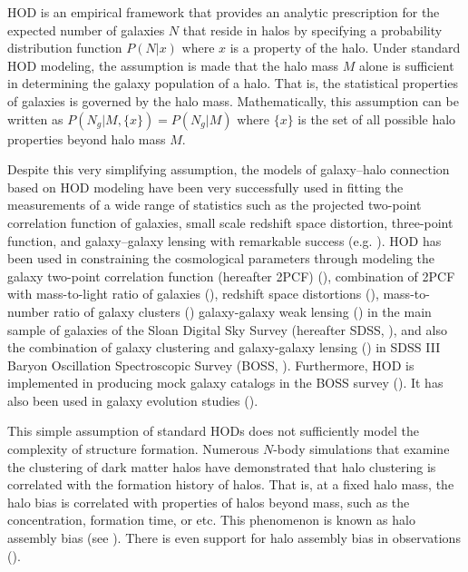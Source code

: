 \documentclass[12pt, preprint]{aastex}
\begin{document}
HOD is an empirical framework that provides an analytic prescription for the expected number of galaxies $N$ that reside in halos by specifying a probability distribution function $P(N|x)$ where $x$ is a property of the halo. Under standard HOD modeling, the assumption is made that the halo mass $M$ alone is sufficient in determining the galaxy population of a halo. That is, the statistical properties of galaxies is governed by the halo mass. Mathematically, this assumption can be written as $P(N_g|M,\{x\})=P(N_g|M)$ where $\{x\}$ is the set of all possible halo properties beyond halo mass $M$.

Despite this very simplifying assumption, the models of galaxy--halo connection based on HOD modeling have been very successfully used in fitting the measurements of a wide range of statistics such as the projected two-point correlation function of galaxies, small scale redshift space distortion, three-point function, and galaxy--galaxy lensing with remarkable success (e.g. \citealt{zheng07,tinker_rsd2007,zehavi2011,leauthaud12,parejko2013,coupon2015,hod-3pcf,guo2015,miyatake15,zu2015,hod_vs_sham}). 
HOD has been used in constraining the cosmological parameters through modeling the galaxy two-point correlation function (hereafter 2PCF) (\citealt{abazajian2005}), combination of 2PCF with mass-to-light ratio of galaxies (\citealt{tinker05}), redshift space distortions (\citealt{tinker_rsd2007}), mass-to-number ratio of galaxy clusters (\citealt{tinker2012}) galaxy-galaxy weak lensing (\citealt{vdb03,cacciato13,more13,vdb13}) in the main sample of galaxies
of the Sloan Digital Sky Survey (hereafter SDSS, \citealt{york2000}), and also the combination of galaxy clustering and galaxy-galaxy lensing (\citealt{more15}) in SDSS III Baryon Oscillation Spectroscopic Survey (BOSS, \citealt{boss}). Furthermore, HOD is implemented in producing mock galaxy catalogs in the BOSS survey (\citealt{manera2013,white2014}). It has also been used in galaxy evolution studies (\citealt{conroy2009,leauthaud12,behroozi13,hudson2015,zu2015,zu2016}).

This simple assumption of standard HODs  
does not sufficiently model the complexity of structure formation. Numerous $N$-body simulations that examine the clustering of 
dark matter halos have demonstrated that halo clustering is correlated with the formation 
history of halos. That is, at a fixed halo mass, the halo bias is correlated 
with properties of halos beyond mass, such as the concentration, formation time, or etc. 
This phenomenon is known as halo assembly bias (see \citealt{sheth2004,gao2005, harker2006, weschler2006, gao2007,croton2007,wang2007,angulo2008,dalal2008,li2008,sunayama2016}). 
There is even support for halo assembly bias in observations (\citealt{miyatake2016,more2016}).
\end{document}
